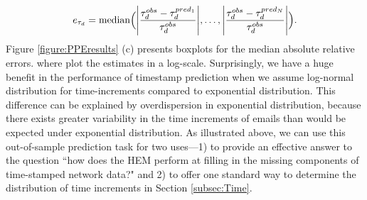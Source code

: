\documentclass[ba]{imsart}
\numberwithin{equation}{section}
\theoremstyle{plain}
\DeclarePairedDelimiter\abs{\lvert}{\rvert}
\begin{document}
	\fi
	\begin{equation}
		e_{\tau_d} = \mbox{median}\Big(\abs*{\frac{\tau^{obs}_d - \tau^{pred_1}_{d}}{\tau^{obs}_d}},\ldots, \abs*{\frac{\tau^{obs}_d - \tau^{pred_N}_{d}}{\tau^{obs}_d}}\Big).
	\end{equation}
	Figure \ref{figure:PPEresults} (c) presents boxplots for the median absolute relative errors. where plot the estimates in a log-scale. Surprisingly, we have a huge benefit in the performance of timestamp prediction when we assume log-normal distribution for time-increments compared to exponential distribution. This difference can be explained by overdispersion in exponential distribution, because there exists greater variability in the time increments of emails than would be expected under exponential distribution. As illustrated above, we can use this out-of-sample prediction task for two uses---1) to provide an effective answer to the question ``how does the HEM perform at filling in the missing components of time-stamped network data?" and 2) to offer one standard way to determine the distribution of time increments in Section \ref{subsec:Time}. 
	
\end{document}
